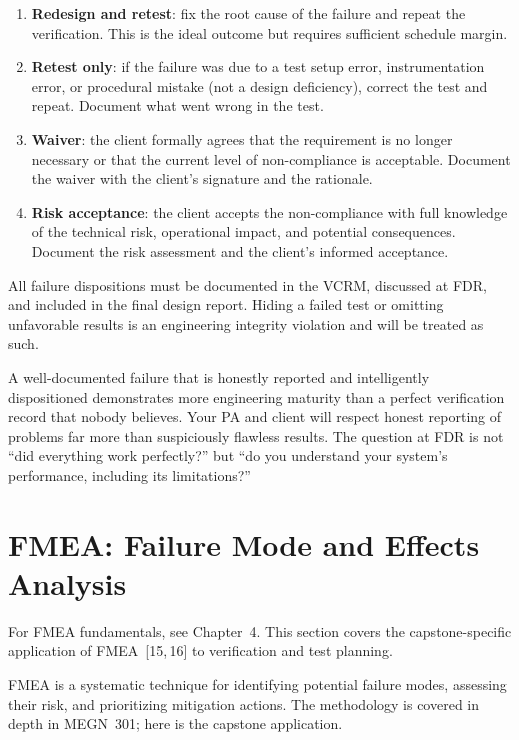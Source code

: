 \begin{enumerate}[nosep,leftmargin=1.5em]
\item \textbf{Redesign and retest}: fix the root cause of the failure and repeat the verification. This is the ideal outcome but requires sufficient schedule margin.
\item \textbf{Retest only}: if the failure was due to a test setup error, instrumentation error, or procedural mistake (not a design deficiency), correct the test and repeat. Document what went wrong in the test.
\item \textbf{Waiver}: the client formally agrees that the requirement is no longer necessary or that the current level of non-compliance is acceptable. Document the waiver with the client's signature and the rationale.
\item \textbf{Risk acceptance}: the client accepts the non-compliance with full knowledge of the technical risk, operational impact, and potential consequences. Document the risk assessment and the client's informed acceptance.
\end{enumerate}

All failure dispositions must be documented in the VCRM, discussed at FDR, and included in the final design report. Hiding a failed test or omitting unfavorable results is an engineering integrity violation and will be treated as such.

\begin{tipbox}
A well-documented failure that is honestly reported and intelligently dispositioned demonstrates more engineering maturity than a perfect verification record that nobody believes. Your PA and client will respect honest reporting of problems far more than suspiciously flawless results. The question at FDR is not ``did everything work perfectly?'' but ``do you understand your system's performance, including its limitations?''
\end{tipbox}


\section{FMEA: Failure Mode and Effects Analysis}
For FMEA fundamentals, see Chapter~4. This section covers the capstone-specific application of FMEA~[15,\,16] to verification and test planning.

FMEA is a systematic technique for identifying potential failure modes, assessing their risk, and prioritizing mitigation actions. The methodology is covered in depth in MEGN~301; here is the capstone application.

